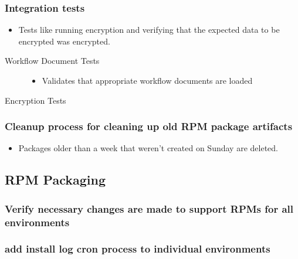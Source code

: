 \subsubsection{Integration tests}
\label{sec-1.2.3}

\begin{itemize}
\item Tests like running encryption and verifying that the expected data to be encrypted 
      was encrypted.
\end{itemize}

\begin{description}

\item[Workflow Document Tests]\label{sec-1.2.3.1}


\begin{itemize}
\item Validates that appropriate workflow documents are loaded
\end{itemize}

\end{description}
\begin{description}

\item[Encryption Tests]\label{sec-1.2.3.2}


\end{description}
\subsubsection{Cleanup process for cleaning up old RPM package artifacts}
\label{sec-1.2.4}

\begin{itemize}
\item Packages older than a week that weren't created on Sunday are deleted.
\end{itemize}

\subsection{RPM Packaging}
\label{sec-1.3}

\subsubsection{Verify necessary changes are made to support RPMs for all environments}
\label{sec-1.3.1}

\subsubsection{add install log cron process to individual environments}
\label{sec-1.3.2}



